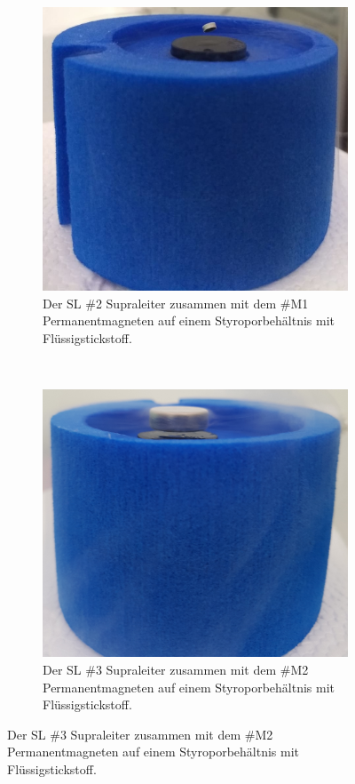 \begin{figure}[H]
\centering
	\begin{subfigure}[t]{0.45\textwidth}
    \includegraphics[width=\textwidth]{Auswertung/SL_1.jpg}
    \caption{Der SL \#2 Supraleiter zusammen mit dem \#M1 Permanentmagneten auf
		einem Styroporbehältnis mit Flüssigstickstoff.}
    \label{fig:SL1}
	\end{subfigure}
	~
	\begin{subfigure}[t]{0.45\textwidth}
    \includegraphics[width=1.06\textwidth]{Auswertung/SL_2.jpg}
    \caption{Der SL \#3 Supraleiter zusammen mit dem \#M2 Permanentmagneten auf
		einem Styroporbehältnis mit Flüssigstickstoff.}
    \label{fig:SL2}
	\end{subfigure}
\end{figure}

